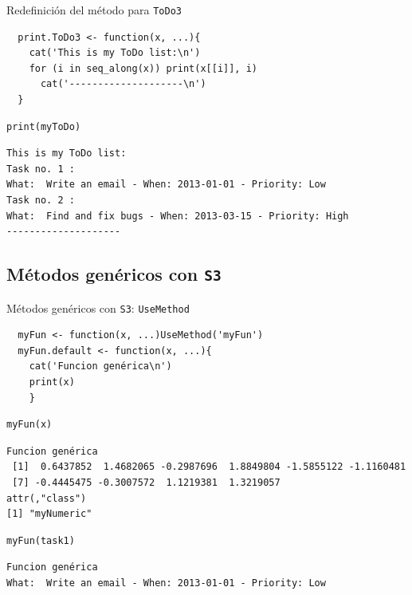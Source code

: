 \documentclass[xcolor={usenames,svgnames,dvipsnames}]{beamer}
\begin{document}
\begin{frame}[fragile,label={sec:orgheadline14}]{Redefinición del método para \texttt{ToDo3}}
 \lstset{language=R,label= ,caption= ,captionpos=b,numbers=none}
\begin{lstlisting}
  print.ToDo3 <- function(x, ...){
    cat('This is my ToDo list:\n')
    for (i in seq_along(x)) print(x[[i]], i)
      cat('--------------------\n')
  }
\end{lstlisting}

\lstset{language=R,label= ,caption= ,captionpos=b,numbers=none}
\begin{lstlisting}
print(myToDo)
\end{lstlisting}

\begin{verbatim}
This is my ToDo list:
Task no. 1 :
What:  Write an email - When: 2013-01-01 - Priority: Low 
Task no. 2 :
What:  Find and fix bugs - When: 2013-03-15 - Priority: High 
--------------------
\end{verbatim}
\end{frame}

\subsection{Métodos genéricos con \texttt{S3}}
\label{sec:orgheadline19}
\begin{frame}[fragile,label={sec:orgheadline16}]{Métodos genéricos con \texttt{S3}: \texttt{UseMethod}}
 \lstset{language=R,label= ,caption= ,captionpos=b,numbers=none}
\begin{lstlisting}
  myFun <- function(x, ...)UseMethod('myFun')
  myFun.default <- function(x, ...){
    cat('Funcion genérica\n')
    print(x)
    }
\end{lstlisting}

\lstset{language=R,label= ,caption= ,captionpos=b,numbers=none}
\begin{lstlisting}
myFun(x)
\end{lstlisting}

\begin{verbatim}
Funcion genérica
 [1]  0.6437852  1.4682065 -0.2987696  1.8849804 -1.5855122 -1.1160481
 [7] -0.4445475 -0.3007572  1.1219381  1.3219057
attr(,"class")
[1] "myNumeric"
\end{verbatim}

\lstset{language=R,label= ,caption= ,captionpos=b,numbers=none}
\begin{lstlisting}
myFun(task1)
\end{lstlisting}

\begin{verbatim}
Funcion genérica
What:  Write an email - When: 2013-01-01 - Priority: Low
\end{verbatim}
\end{frame}
\end{document}
